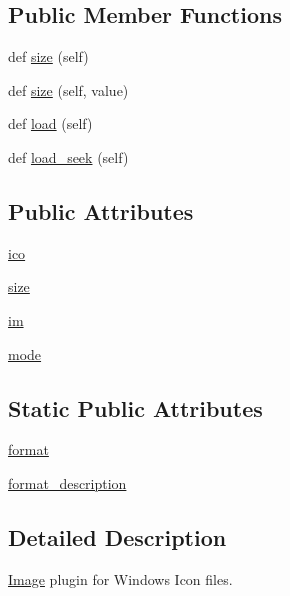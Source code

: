 \subsection*{Public Member Functions}
\begin{DoxyCompactItemize}
\item 
def \hyperlink{classPIL_1_1IcoImagePlugin_1_1IcoImageFile_a2127b133ebc6e88083f5f8694eef381a}{size} (self)
\item 
def \hyperlink{classPIL_1_1IcoImagePlugin_1_1IcoImageFile_ae41dc548fd36d0eb543939845ab7e3dd}{size} (self, value)
\item 
def \hyperlink{classPIL_1_1IcoImagePlugin_1_1IcoImageFile_af6e37185ed8c54192b414eeed5d6a734}{load} (self)
\item 
def \hyperlink{classPIL_1_1IcoImagePlugin_1_1IcoImageFile_a0c90ca26415ff9316d6e4394551d6af2}{load\+\_\+seek} (self)
\end{DoxyCompactItemize}
\subsection*{Public Attributes}
\begin{DoxyCompactItemize}
\item 
\hyperlink{classPIL_1_1IcoImagePlugin_1_1IcoImageFile_ae210c6f6893956e3bce3efe9e38e4123}{ico}
\item 
\hyperlink{classPIL_1_1IcoImagePlugin_1_1IcoImageFile_ab94517beb89a66d9842aacc7be7e8a2f}{size}
\item 
\hyperlink{classPIL_1_1IcoImagePlugin_1_1IcoImageFile_ae8e1c596e4b6cc2df9c4bc035ac43bae}{im}
\item 
\hyperlink{classPIL_1_1IcoImagePlugin_1_1IcoImageFile_a5487577c7801231235bb4568cd576226}{mode}
\end{DoxyCompactItemize}
\subsection*{Static Public Attributes}
\begin{DoxyCompactItemize}
\item 
\hyperlink{classPIL_1_1IcoImagePlugin_1_1IcoImageFile_a28dadf14f3390f12308f1ac766230978}{format}
\item 
\hyperlink{classPIL_1_1IcoImagePlugin_1_1IcoImageFile_a0448a992b0b8a9eeb6bfeb5ce28511dd}{format\+\_\+description}
\end{DoxyCompactItemize}


\subsection{Detailed Description}
\hyperlink{namespacePIL_1_1Image}{Image} plugin for Windows Icon files. 


